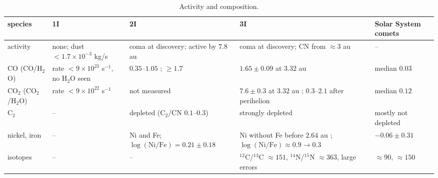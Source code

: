 \documentclass[11pt]{article}
\theoremstyle{definition}\newtheorem{definition}[theorem]{Definition}
\theoremstyle{remark}\newtheorem{remark}[theorem]{Remark}
\begin{document}
\begin{table}[!htb]\centering\footnotesize\setlength{\tabcolsep}{3.5pt}
\begin{tabular}{@{}>{\raggedright\arraybackslash}p{2.0cm}>{\raggedright\arraybackslash}p{2.8cm}>{\raggedright\arraybackslash}p{3.6cm}>{\raggedright\arraybackslash}p{3.8cm}>{\raggedright\arraybackslash}p{2.3cm}@{}}\toprule
species & 1I & 2I & 3I & Solar System comets\\\midrule
activity & none; dust $<1.7\times10^{-3}$ kg/s \cite{ISSI19} & coma at discovery; active by $7.8$ au \cite{Ye20} & coma at discovery; CN from $\approx3$ au \cite{Rahat25} & --\\
CO (CO/H$_2$O) & rate $<9\times10^{23}$ s$^{-1}$, no H$_2$O seen \cite{Trilling18} & $0.35$--$1.05$ \cite{Cordiner20}; $\ge1.7$ \cite{Bodewits20} & $1.65\pm0.09$ at $3.32$ au \cite{Cordiner25} & median $0.03$ \cite{HP22}\\
CO$_2$ (CO$_2$/H$_2$O) & rate $<9\times10^{22}$ s$^{-1}$ \cite{Trilling18} & not measured & $7.6\pm0.3$ at $3.32$ au \cite{Cordiner25}; $0.3$--$2.1$ after perihelion \cite{Shinnaka26} & median $0.12$ \cite{HP22}\\
C$_2$ & -- & depleted (C$_2$/CN $0.1$--$0.3$) \cite{Deam26} & strongly depleted \cite{Paek26} & mostly not depleted\\
nickel, iron & -- & Ni and Fe; $\log(\mathrm{Ni/Fe})=0.21\pm0.18$ \cite{GD21,Opitom21} & Ni without Fe before $2.64$ au \cite{Rahat25}; $\log(\mathrm{Ni/Fe})\approx0.9\to0.3$ \cite{Hutsemekers26} & $-0.06\pm0.31$ \cite{Manfroid21}\\
isotopes & -- & -- & $^{12}$C/$^{13}$C $\approx151$, $^{14}$N/$^{15}$N $\approx363$, large errors \cite{Opitom26} & $\approx90$, $\approx150$ \cite{Opitom26}\\\bottomrule
\end{tabular}
\caption{Activity and composition.}\label{tab:isocomp}
\end{table}
\end{document}
